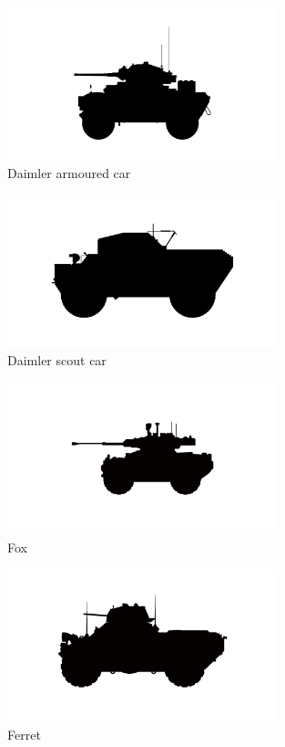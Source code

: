 \begin{figure}[h]
  \centering
  \includegraphics[width=0.7\textwidth]{platforms/daimler-armoured-car.pdf}
  \caption*{Daimler armoured car}
\end{figure}

\begin{figure}[h]
  \centering
  \includegraphics[width=0.7\textwidth]{platforms/daimler-scout.pdf}
  \caption*{Daimler scout car}
\end{figure}

\begin{figure}[h]
  \centering
  \includegraphics[width=0.7\textwidth]{platforms/fox.pdf}
  \caption*{Fox}
\end{figure}

\begin{figure}[h]
  \centering
  \includegraphics[width=0.7\textwidth]{platforms/ferret.pdf}
  \caption*{Ferret}
\end{figure}


